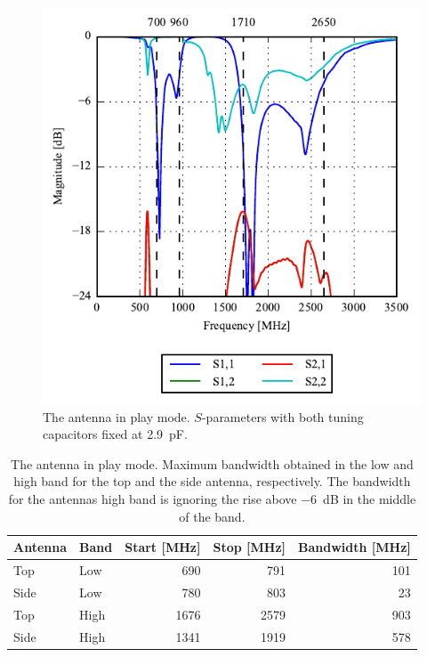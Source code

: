 \begin{figure}[htbp]
    \centering
    \includegraphics{img/tech_sol/nonresonant/simulation/play_mode/s_params_cMax.pdf}
    \caption{The antenna in play mode. $S$-parameters with both tuning capacitors fixed at \SI{2.9}{pF}.}
    \label{fig:ant3_sparam_play}
\end{figure}

\begin{table}[htbp]
    \centering
    \begin{tabular}{|l|l|r|r|r|}
        \hline
        Antenna & Band & Start [MHz] & Stop [MHz] & Bandwidth [MHz] \\
        \hline
        Top     & Low  & 690         & 791        & 101  \\
        Side    & Low  & 780         & 803        & 23   \\
        \hline
        Top     & High & 1676        & 2579       & 903 \\
        Side    & High & 1341        & 1919       & 578 \\
        \hline
    \end{tabular}
    \caption{The antenna in play mode. Maximum bandwidth obtained in the low and high band for the top and the side antenna, respectively. The bandwidth for the antennas high band is ignoring the rise above \SI{-6}{dB} in the middle of the band.}
    \label{tab:bw_sol3play}
\end{table}

